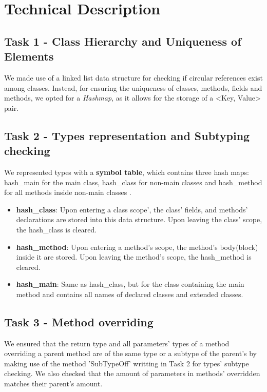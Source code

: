 \documentclass[paper=a4, fontsize=11pt]{scrartcl}
\numberwithin{equation}{section}		%
\numberwithin{figure}{section}			%
\numberwithin{table}{section}				%
\begin{document}
\section*{Technical Description}

\subsection*{Task 1 - Class Hierarchy and Uniqueness of Elements}
We made use of a linked list data structure for checking if circular references exist among classes. Instead, for ensuring the uniqueness of classes, methods, fields and methods, we opted for a \textit{Hashmap}, as it allows for the storage of a <Key, Value> pair. 
\subsection*{Task 2 - Types representation and Subtyping checking}
We represented types with a \textbf{symbol table}, which contains three hash maps: hash\_main for the main class, hash\_class for non-main classes and hash\_method for all methods inside non-main classes \cite{California}.\\
\begin{itemize}
	\item \textbf{hash\_class}: Upon entering a class scope', the class' fields, and methods' declarations are stored into this data structure. Upon leaving the class' scope, the hash\_class is cleared.
	\item \textbf{hash\_method}: Upon entering a method's scope, the method's body(block) inside it are stored. Upon leaving the method's scope, the hash\_method is cleared.
	\item \textbf{hash\_main}: Same as hash\_class, but for the class containing the main method and contains all names of declared classes and extended classes. 
\end{itemize}

\subsection*{Task 3 - Method overriding}
We ensured that the return type and all parameters' types of a method overriding a parent method are of the same type or a subtype of the parent's by making use of the method 'SubTypeOff' writting in Task 2 for types' subtype checking. We also checked that the amount of parameters in methods' overridden matches their parent's amount. 
\end{document}
